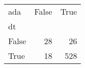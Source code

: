 \begin{tabular}{lrr}
\toprule
ada &  False &  True  \\
dt    &        &        \\
\midrule
False &     28 &     26 \\
True  &     18 &    528 \\
\bottomrule
\end{tabular}
